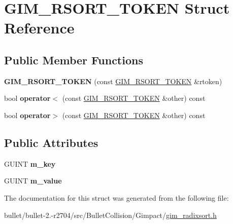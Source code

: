 \hypertarget{struct_g_i_m___r_s_o_r_t___t_o_k_e_n}{\section{G\+I\+M\+\_\+\+R\+S\+O\+R\+T\+\_\+\+T\+O\+K\+E\+N Struct Reference}
\label{struct_g_i_m___r_s_o_r_t___t_o_k_e_n}
}
\subsection*{Public Member Functions}
\begin{DoxyCompactItemize}
\item 
\hypertarget{struct_g_i_m___r_s_o_r_t___t_o_k_e_n_abf4d93d981f2b19ef0db94f077bf0214}{{\bfseries G\+I\+M\+\_\+\+R\+S\+O\+R\+T\+\_\+\+T\+O\+K\+E\+N} (const \hyperlink{struct_g_i_m___r_s_o_r_t___t_o_k_e_n}{G\+I\+M\+\_\+\+R\+S\+O\+R\+T\+\_\+\+T\+O\+K\+E\+N} \&rtoken)}\label{struct_g_i_m___r_s_o_r_t___t_o_k_e_n_abf4d93d981f2b19ef0db94f077bf0214}

\item 
\hypertarget{struct_g_i_m___r_s_o_r_t___t_o_k_e_n_ad313bf91ad40977eee486e8f98a54a01}{bool {\bfseries operator$<$} (const \hyperlink{struct_g_i_m___r_s_o_r_t___t_o_k_e_n}{G\+I\+M\+\_\+\+R\+S\+O\+R\+T\+\_\+\+T\+O\+K\+E\+N} \&other) const }\label{struct_g_i_m___r_s_o_r_t___t_o_k_e_n_ad313bf91ad40977eee486e8f98a54a01}

\item 
\hypertarget{struct_g_i_m___r_s_o_r_t___t_o_k_e_n_ae9083f297880a278660a740656cc3507}{bool {\bfseries operator$>$} (const \hyperlink{struct_g_i_m___r_s_o_r_t___t_o_k_e_n}{G\+I\+M\+\_\+\+R\+S\+O\+R\+T\+\_\+\+T\+O\+K\+E\+N} \&other) const }\label{struct_g_i_m___r_s_o_r_t___t_o_k_e_n_ae9083f297880a278660a740656cc3507}

\end{DoxyCompactItemize}
\subsection*{Public Attributes}
\begin{DoxyCompactItemize}
\item 
\hypertarget{struct_g_i_m___r_s_o_r_t___t_o_k_e_n_a86c043951bfaad74e57bffadb64b8d30}{G\+U\+I\+N\+T {\bfseries m\+\_\+key}}\label{struct_g_i_m___r_s_o_r_t___t_o_k_e_n_a86c043951bfaad74e57bffadb64b8d30}

\item 
\hypertarget{struct_g_i_m___r_s_o_r_t___t_o_k_e_n_aca09acfff366734f7529fb9cd082ba00}{G\+U\+I\+N\+T {\bfseries m\+\_\+value}}\label{struct_g_i_m___r_s_o_r_t___t_o_k_e_n_aca09acfff366734f7529fb9cd082ba00}

\end{DoxyCompactItemize}


The documentation for this struct was generated from the following file\+:\begin{DoxyCompactItemize}
\item 
bullet/bullet-\/2.-\/r2704/src/\+Bullet\+Collision/\+Gimpact/\hyperlink{gim__radixsort_8h}{gim\+\_\+radixsort.\+h}\end{DoxyCompactItemize}
